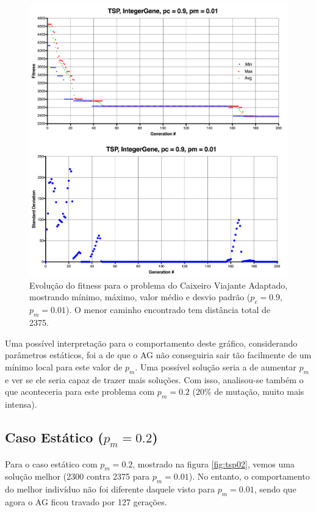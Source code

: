 \begin{figure}[ht!]
    \centering \includegraphics[width=1.0\textwidth]{tsp_001.jpg}
    \caption{Evolução do fitness para o problema do Caixeiro Viajante Adaptado, mostrando mínimo, máximo, valor médio e desvio padrão ($p_c=0.9$, $p_m=0.01$). O menor caminho encontrado tem distância total de 2375.}
    \label{fig:tsp001}
\end{figure}

Uma possível interpretação para o comportamento deste gráfico, considerando parâmetros estáticos, foi a de que o AG não conseguiria sair tão facilmente de um mínimo local para este valor de $p_m$. Uma possível solução seria a de aumentar $p_m$ e ver se ele seria capaz de trazer mais soluções. Com isso, analisou-se também o que aconteceria para este problema com $p_m = 0.2$ (20\% de mutação, muito mais intensa).

\subsection{Caso Estático ($p_m = 0.2$)}

Para o caso estático com $p_m = 0.2$, mostrado na figura \ref{fig:tsp02}, vemos uma solução melhor (2300 contra 2375 para $p_m = 0.01$). No entanto, o comportamento do melhor indivíduo não foi diferente daquele visto para $p_m = 0.01$, sendo que agora o AG ficou travado por 127 gerações. 

